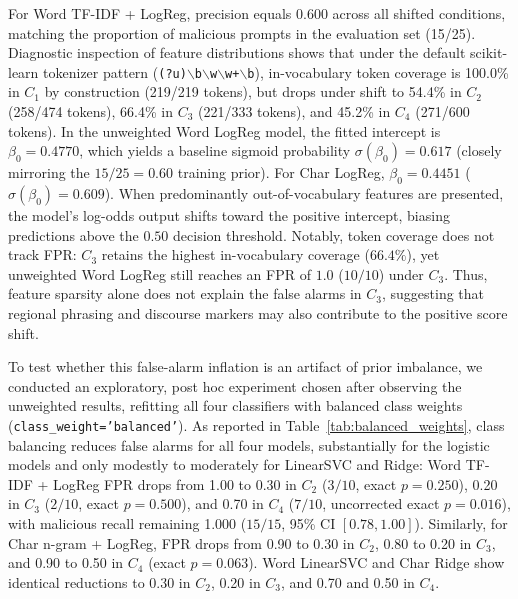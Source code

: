 \documentclass[conference]{IEEEtran}
\begin{document}
For Word TF-IDF + LogReg, precision equals 0.600 across all shifted conditions, matching the proportion of malicious prompts in the evaluation set (15/25). Diagnostic inspection of feature distributions shows that under the default scikit-learn tokenizer pattern (\texttt{(?u)$\backslash$b$\backslash$w$\backslash$w+$\backslash$b}), in-vocabulary token coverage is 100.0\% in $C_1$ by construction (219/219 tokens), but drops under shift to 54.4\% in $C_2$ (258/474 tokens), 66.4\% in $C_3$ (221/333 tokens), and 45.2\% in $C_4$ (271/600 tokens). In the unweighted Word LogReg model, the fitted intercept is $\beta_0 = 0.4770$, which yields a baseline sigmoid probability $\sigma(\beta_0) = 0.617$ (closely mirroring the $15/25 = 0.60$ training prior). For Char LogReg, $\beta_0 = 0.4451$ ($\sigma(\beta_0) = 0.609$). When predominantly out-of-vocabulary features are presented, the model's log-odds output shifts toward the positive intercept, biasing predictions above the $0.50$ decision threshold. Notably, token coverage does not track FPR: $C_3$ retains the highest in-vocabulary coverage ($66.4\%$), yet unweighted Word LogReg still reaches an FPR of $1.0$ ($10/10$) under $C_3$. Thus, feature sparsity alone does not explain the false alarms in $C_3$, suggesting that regional phrasing and discourse markers may also contribute to the positive score shift.

To test whether this false-alarm inflation is an artifact of prior imbalance, we conducted an exploratory, post hoc experiment chosen after observing the unweighted results, refitting all four classifiers with balanced class weights (\texttt{class\_weight='balanced'}). As reported in Table~\ref{tab:balanced_weights}, class balancing reduces false alarms for all four models, substantially for the logistic models and only modestly to moderately for LinearSVC and Ridge: Word TF-IDF + LogReg FPR drops from 1.00 to 0.30 in $C_2$ ($3/10$, exact $p = 0.250$), 0.20 in $C_3$ ($2/10$, exact $p = 0.500$), and 0.70 in $C_4$ ($7/10$, uncorrected exact $p = 0.016$), with malicious recall remaining 1.000 ($15/15$, 95\% CI $[0.78, 1.00]$). Similarly, for Char n-gram + LogReg, FPR drops from 0.90 to 0.30 in $C_2$, 0.80 to 0.20 in $C_3$, and 0.90 to 0.50 in $C_4$ (exact $p = 0.063$). Word LinearSVC and Char Ridge show identical reductions to 0.30 in $C_2$, 0.20 in $C_3$, and 0.70 and 0.50 in $C_4$. 
\end{document}
